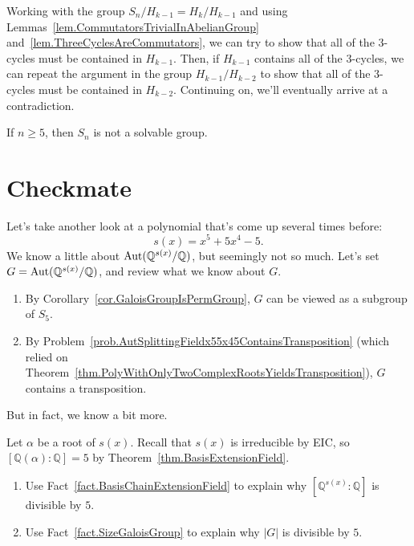 Working with the group $S_n/ H_{k-1} = H_k/ H_{k-1}$ and using Lemmas~\ref{lem.CommutatorsTrivialInAbelianGroup} and~\ref{lem.ThreeCyclesAreCommutators}, we can try to show that all of the $3$-cycles must be contained in $H_{k-1}$. Then, if $H_{k-1}$ contains all of the $3$-cycles, we can repeat the argument in the group $H_{k-1}/ H_{k-2}$ to show that all of the $3$-cycles must be contained in $H_{k-2}$. Continuing on, we'll eventually arrive at a contradiction.

\begin{theorem}\label{thm.SnNotSolvableIfNGreaterThan4}
If $n\ge 5$, then $S_n$ is not a solvable group.
\end{theorem}

\section{Checkmate}

Let's take another look at a polynomial that's come up several times before: \[s(x) = x^5 +5x^4-5.\] We know a little about $\operatorname{Aut}(\mathbb{Q}^{s(x)}/\mathbb{Q})$, but seemingly not so much. Let's set $G = \operatorname{Aut}(\mathbb{Q}^{s(x)}/\mathbb{Q})$, and review what we know about $G$.

\begin{enumerate}[label = \textbf{\Roman*.}]
\item By Corollary~\ref{cor.GaloisGroupIsPermGroup}, $G$ can be viewed as a subgroup of $S_5$.
\item By Problem~\ref{prob.AutSplittingFieldx55x45ContainsTransposition} (which relied on Theorem~\ref{thm.PolyWithOnlyTwoComplexRootsYieldsTransposition}), $G$ contains a transposition.
\end{enumerate}

But in fact, we know a bit more. 

\begin{problem}\label{prob.EndGameOrderGDivisibleBy5}
Let $\alpha$ be a root of $s(x)$. Recall that $s(x)$ is irreducible by EIC, so $[\mathbb{Q}(\alpha):\mathbb{Q}] = 5$ by Theorem~\ref{thm.BasisExtensionField}.
\begin{enumerate}
\item Use Fact~\ref{fact.BasisChainExtensionField} to explain why $[\mathbb{Q}^{s(x)}:\mathbb{Q}]$ is divisible by $5$.
\item Use Fact~\ref{fact.SizeGaloisGroup} to explain why $|G|$ is divisible by $5$.
\end{enumerate}
\end{problem}

